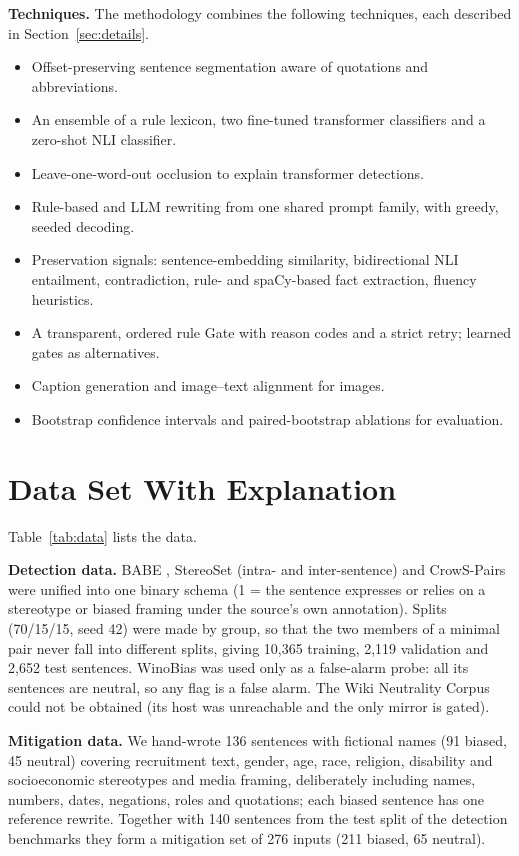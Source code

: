 \documentclass[12pt,a4paper,oneside]{report}
\begin{document}
\textbf{Techniques.} The methodology combines the following techniques, each described in Section~\ref{sec:details}.
\begin{itemize}
\item Offset-preserving sentence segmentation aware of quotations and abbreviations.
\item An ensemble of a rule lexicon, two fine-tuned transformer classifiers and a zero-shot NLI classifier.
\item Leave-one-word-out occlusion to explain transformer detections.
\item Rule-based and LLM rewriting from one shared prompt family, with greedy, seeded decoding.
\item Preservation signals: sentence-embedding similarity, bidirectional NLI entailment, contradiction, rule- and
spaCy-based fact extraction, fluency heuristics.
\item A transparent, ordered rule Gate with reason codes and a strict retry; learned gates as alternatives.
\item Caption generation and image--text alignment for images.
\item Bootstrap confidence intervals and paired-bootstrap ablations for evaluation.
\end{itemize}

\section{Data Set With Explanation}
Table~\ref{tab:data} lists the data.

\textbf{Detection data.} BABE \cite{babe}, StereoSet (intra- and inter-sentence) \cite{stereoset} and CrowS-Pairs
\cite{crows} were unified into one binary schema (1 = the sentence expresses or relies on a stereotype or biased
framing under the source's own annotation). Splits (70/15/15, seed 42) were made by group, so that the two members of a
minimal pair never fall into different splits, giving 10,365 training, 2,119 validation and 2,652 test sentences.
WinoBias \cite{winobias} was used only as a false-alarm probe: all its sentences are neutral, so any flag is a false
alarm. The Wiki Neutrality Corpus \cite{pryzant} could not be obtained (its host was unreachable and the only mirror is
gated).

\textbf{Mitigation data.} We hand-wrote 136 sentences with fictional names (91 biased, 45 neutral) covering recruitment
text, gender, age, race, religion, disability and socioeconomic stereotypes and media framing, deliberately including
names, numbers, dates, negations, roles and quotations; each biased sentence has one reference rewrite. Together with 140
sentences from the test split of the detection benchmarks they form a mitigation set of 276 inputs (211 biased, 65
neutral).
\end{document}
